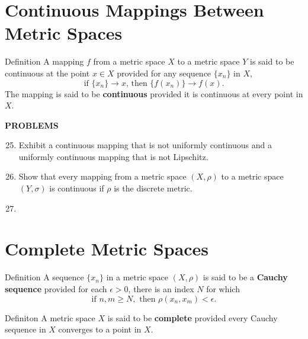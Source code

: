 \section{Continuous Mappings Between Metric Spaces}

\begin{namedthm*}{Definition}
    A mapping $f$ from a metric space $X$ to a metric space $Y$ is said to be continuous at the point $x\in X$ provided for any sequence $\{x_n\}$ in $X$,
    \[
        \text{if $\{x_n\}\to x$, then $\{f(x_n)\}\to f(x)$}.
    \]
    The mapping is said to be \textbf{continuous} provided it is continuous at every point in $X$.
\end{namedthm*}

\begin{center}
	\textbf{PROBLEMS}
\end{center}
\begin{enumerate}
    \setcounter{enumi}{24}
    \item Exhibit a continuous mapping that is not uniformly continuous and a uniformly continuous mapping that is not Lipschitz.
    \item Show that every mapping from a metric space $(X,\rho)$ to a metric space $(Y,\sigma)$ is continuous if $\rho$ is the discrete metric.
    \item 
\end{enumerate}


\section{Complete Metric Spaces}

\begin{namedthm*}{Definition}
    A sequence $\{x_n\}$ in a metric space $(X,\rho)$ is said to be a \textbf{Cauchy sequence} provided for each $\epsilon>0$, there is an index $N$ for which 
    \[
        \text{if }n,m\ge N,\text{ then }\rho(x_n,x_m)<\epsilon.
    \]
\end{namedthm*}
\begin{namedthm*}{Definiton}
    A metric space $X$ is said to be \textbf{complete} provided every Cauchy sequence in $X$ converges to a point in $X$.
\end{namedthm*}

